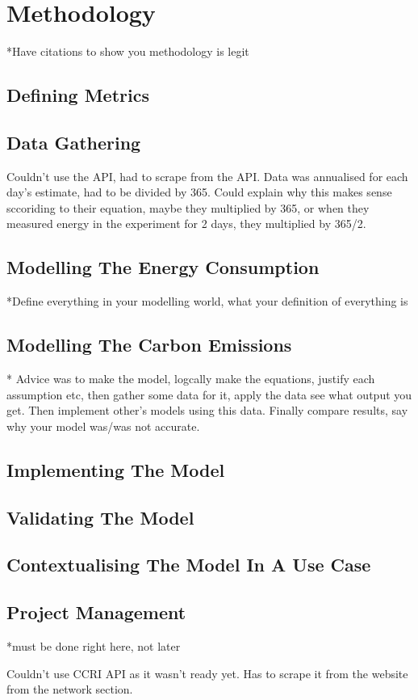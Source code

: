 \chapter {Methodology}
*Have citations to show you methodology is legit

\section {Defining Metrics}


\section {Data Gathering}

Couldn't use the API, had to scrape from the API. Data was annualised for each day's estimate, had to be divided by 365. Could explain why this makes sense sccoriding to their equation, maybe they multiplied by 365, or when they measured energy in the experiment for 2 days, they multiplied by 365/2.

\section {Modelling The Energy Consumption}

*Define everything in your modelling world, what your definition of everything is

\section {Modelling The Carbon Emissions }
* Advice was to make the model, logcally make the equations, justify each assumption etc, then gather some data for it, apply the data see what output you get. Then implement other's models using this data. Finally compare results, say why your model was/was not accurate.

\section {Implementing The Model}
\section {Validating The Model}
\section {Contextualising The Model In A Use Case}

\section {Project Management}
*must be done right here, not later

Couldn't use CCRI API as it wasn't ready yet. Has to scrape it from the website from the network section.